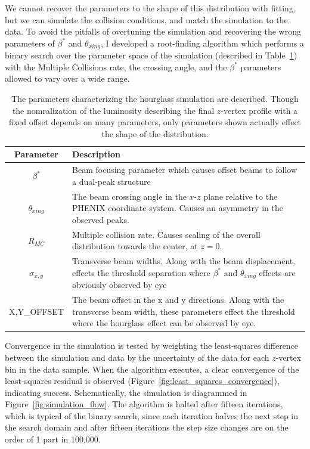We cannot recover the parameters to the shape of this distribution with fitting,
but we can simulate the collision conditions, and match the simulation to the
data. To avoid the pitfalls of overtuning the simulation and recovering the
wrong parameters of $\beta^*$ and $\theta_{xing}$, I developed a root-finding
algorithm which performs a binary search over the parameter space of the
simulation (described in Table~\ref{tab:hourglass_simulation_parameters}) with
the Multiple Collisions rate, the crossing angle, and the $\beta^*$ parameters
allowed to vary over a wide range.  

\begin{table}[h]
  \centering
  \begin{tabular}{c p{10cm}}
    \toprule
    \textbf{Parameter} & \textbf{Description}\\
    \midrule
    $\beta^*$ & Beam focusing parameter which causes offset beams to follow a
    dual-peak structure \\
    $\theta_{xing}$ & The beam crossing angle in the $x$-$z$ plane relative to
    the PHENIX coordinate system. Causes an asymmetry in the observed peaks. \\
    $R_{MC}$ & Multiple collision rate. Causes scaling of the overall
    distribution towards the center, at $z=0$. \\
    $\sigma_{x,y}$ & Transverse beam widths. Along with the beam displacement,
    effects the threshold separation where $\beta^*$ and $\theta_{xing}$
    effects are obviously observed by eye \\
    {X,Y}\_OFFSET & The beam offset in the x and y directions. Along with the
    transverse beam width, these parameters effect the threshold where the
    hourglass effect can be observed by eye. \\
    \bottomrule
  \end{tabular}
  \caption{
    The parameters characterizing the hourglass simulation are described.
    Though the nomralization of the luminosity describing the final $z$-vertex
    profile with a fixed offset depends on many parameters, only parameters shown
    actually effect the shape of the distribution.
  }
  \label{tab:hourglass_simulation_parameters}
\end{table}

Convergence in the simulation is tested by weighting the least-squares
difference between the simulation and data by the uncertainty of the data for
each $z$-vertex bin in the data sample.  When the algorithm executes, a clear
convergence of the least-squares residual is observed
(Figure~\ref{fig:least_squares_convergence}), indicating success.
Schematically, the simulation is diagrammed in Figure~\ref{fig:simulation_flow}.
The algorithm is halted after fifteen iterations, which is typical of the binary
search, since each iteration halves the next step in the search domain and after
fifteen iterations the step size changes are on the order of 1 part in 100,000. 



